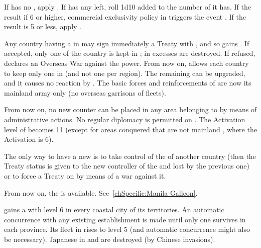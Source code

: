 
\condition{}
\aparag If \paysChine has no \TP, apply .
\aparag If \paysChine has any \TP left, roll 1d10 added to the number of \TP
it has. If the result if 6 or higher, commercial exclusivity policy in
\paysChine triggers the event . If the result
is 5 or less, apply .



\phevnt
\aparag Any country having a \TP in \paysChine may sign immediately a Treaty
with \paysChine, and so gains \dipAT. If accepted, only one \TP of the country
is kept in \paysChine; \TP in excesses are destroyed. If refused, \paysChine
declares an Overseas War against the power.
\aparag From now on, \dipAT allows each country to keep only one \TP in
\paysChine (and not one per region). The remaining \TP can be upgraded, and it
causes no reaction by \paysChine.
\aparag The basic forces and reinforcements of \paysChine are now its mainland
army only (no overseas garrisons of fleets).

\effetlong
\aparag From now on, no new \TP counter can be placed in any area belonging to
\paysChine by means of administrative actions.
\aparag No regular diplomacy is permitted on \paysChine.  The Activation level
of \paysChine becomes 11 (except for areas conquered that are not mainland
\paysChine, where the Activation is 6).

\aparag The only way to have a new \TP is to take control of the \TP of
another country (then the Treaty status is given to the new controller of the
\TP and lost by the previous one) or to force a Treaty on \paysChine by means
of a war against it.

\aparag From now on, the  is
available. See~\ref{chSpecific:Manila Galleon}.



\phevnt
\aparag \paysChine gains a \TP with level 6 in every coastal city of its
territories.  An automatic concurrence with any existing establishment is made
until only one \TP survives in each province. Its fleet in  rises
to level 5 (and automatic concurrence might also be necessary).
\aparag Japanese \TP in \granderegionCorea and \granderegionFormose are
destroyed (by Chinese invasions).

